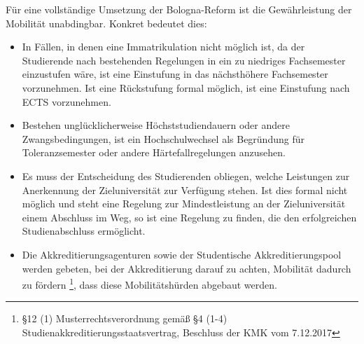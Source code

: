         Für eine vollständige Umsetzung der Bologna-Reform ist die Gewährleistung der Mobilität unabdingbar. Konkret bedeutet dies: \\
        \begin{itemize}
          \item In Fällen, in denen eine Immatrikulation nicht möglich ist, da der Studierende nach bestehenden Regelungen in ein zu niedriges Fachsemester einzustufen wäre, ist eine Einstufung in das nächsthöhere Fachsemester vorzunehmen. Ist eine Rückstufung formal möglich, ist eine Einstufung nach ECTS vorzunehmen.
          \item Bestehen unglücklicherweise Höchststudiendauern oder andere Zwangsbedingungen, ist ein Hochschulwechsel als Begründung für Toleranzsemester oder andere Härtefallregelungen anzusehen.
          \item Es muss der Entscheidung des Studierenden obliegen, welche Leistungen zur Anerkennung der Zieluniversität zur Verfügung stehen. Ist dies formal nicht möglich und steht eine Regelung zur Mindestleistung an der Zieluniversität einem Abschluss im Weg, so ist eine Regelung zu finden, die den erfolgreichen Studienabschluss ermöglicht.
          \item Die Akkreditierungsagenturen sowie der Studentische Akkreditierungspool werden gebeten, bei der Akkreditierung darauf zu achten, Mobilität dadurch zu fördern \footnote{§12 (1) Musterrechtsverordnung gemäß §4 (1-4) Studienakkreditierungsstaatsvertrag, Beschluss der KMK vom 7.12.2017}, dass diese Mobilitätshürden abgebaut werden.
        \end{itemize}
